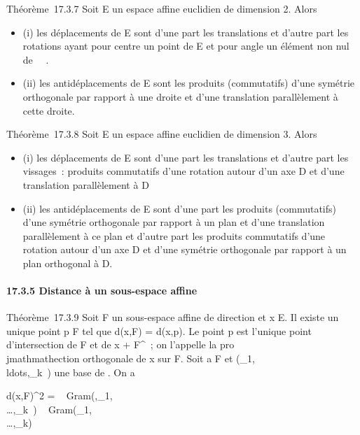 \documentclass[]{article}
\begin{document}
Théorème~17.3.7 Soit E un espace affine euclidien de dimension 2. Alors

\begin{itemize}
\itemsep1pt\parskip0pt
\item
  (i) les déplacements de E sont d'une part les translations et d'autre
  part les rotations ayant pour centre un point de E et pour angle un
  élément non nul de ~\pi~.
\item
  (ii) les antidéplacements de E sont les produits (commutatifs) d'une
  symétrie orthogonale par rapport à une droite et d'une translation
  parallèlement à cette droite.
\end{itemize}

Théorème~17.3.8 Soit E un espace affine euclidien de dimension 3. Alors

\begin{itemize}
\itemsep1pt\parskip0pt
\item
  (i) les déplacements de E sont d'une part les translations et d'autre
  part les vissages~: produits commutatifs d'une rotation autour d'un
  axe D et d'une translation parallèlement à D
\item
  (ii) les antidéplacements de E sont d'une part les produits
  (commutatifs) d'une symétrie orthogonale par rapport à un plan et
  d'une translation parallèlement à ce plan et d'autre part les produits
  commutatifs d'une rotation autour d'un axe D et d'une symétrie
  orthogonale par rapport à un plan orthogonal à D.
\end{itemize}

\paragraph{17.3.5 Distance à un sous-espace affine}

Théorème~17.3.9 Soit F un sous-espace affine de direction
\overrightarrowF et x \in E. Il existe un unique point
p \in F tel que d(x,F) = d(x,p). Le point p est l'unique point
d'intersection de F et de x +\overrightarrow
F^\bot~; on l'appelle la pro\\jmathmathection orthogonale de x sur F.
Soit a \in F et
(\vece_1,\\ldots,\vece_k~)
une base de \overrightarrowF. On a

d(x,F)^2 =
~
Gram(\overrightarrowax,\vece_1,\\\ldots,\vece_k~)
\over
{}~
Gram(\vece_1,\\\ldots,\vece_k)~
\end{document}
